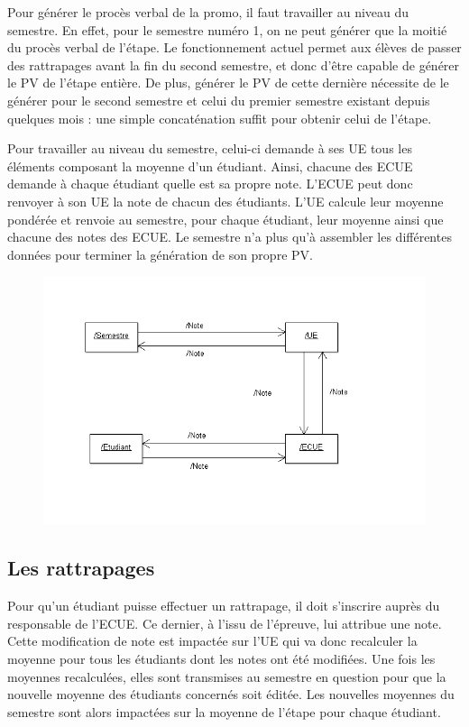 \documentclass[letter, 11pt] {article}
\begin{document}
		Pour générer le procès verbal de la promo, il faut travailler au niveau du semestre. En effet, pour le semestre numéro 1, on ne peut générer que la moitié du procès verbal de l’étape. Le fonctionnement actuel permet aux élèves de passer des rattrapages avant la fin du second semestre, et donc d’être capable de générer le PV de l’étape entière. De plus, générer le PV de cette dernière nécessite de le générer pour le second semestre et celui du premier semestre existant depuis quelques mois : une simple concaténation suffit pour obtenir celui de l’étape.
		
	Pour travailler au niveau du semestre, celui-ci demande à ses UE tous les éléments composant la moyenne d'un étudiant. Ainsi, chacune des ECUE demande à chaque étudiant quelle est sa propre note. L’ECUE peut donc renvoyer à son UE la note de chacun des étudiants. L’UE calcule leur moyenne pondérée et renvoie au semestre, pour chaque étudiant, leur moyenne ainsi que chacune des notes des ECUE.	Le semestre n’a plus qu’à assembler les différentes données pour terminer la génération de son propre PV.
		
		\begin{figure}[htbp]
			\centering
				\includegraphics[scale = 0.7]{../Diagrammes_collaboration/Impression_PV.png}
		\end{figure}
		
		\newpage
		
		\subsection{Les rattrapages}
		
		Pour qu’un étudiant puisse effectuer un rattrapage, il doit s’inscrire auprès du responsable de l’ECUE. Ce dernier, à l’issu de l’épreuve, lui attribue une note. Cette modification de note est impactée sur l’UE qui va donc recalculer la moyenne pour tous les étudiants dont les notes ont été modifiées. Une fois les moyennes recalculées, elles sont transmises au semestre en question pour que la nouvelle moyenne des étudiants concernés soit éditée. Les nouvelles moyennes du semestre sont alors impactées sur la moyenne de l’étape pour chaque étudiant.
		
\end{document}
